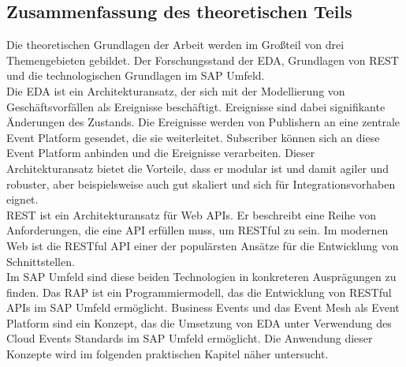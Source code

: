 \subsection{Zusammenfassung des theoretischen Teils}
Die theoretischen Grundlagen der Arbeit werden im Großteil von drei Themengebieten gebildet. Der Forschungsstand der \ac{EDA}, Grundlagen von REST und die technologischen Grundlagen im SAP Umfeld. \\
Die \ac{EDA} ist ein Architekturansatz, der sich mit der Modellierung von Geschäftsvorfällen als Ereignisse beschäftigt. Ereignisse sind dabei signifikante Änderungen des Zustands. Die Ereignisse werden von Publishern an eine zentrale Event Platform gesendet, die sie weiterleitet. Subscriber können sich an diese Event Platform anbinden und die Ereignisse verarbeiten. Dieser Architekturansatz bietet die Vorteile, dass er modular ist und damit agiler und robuster, aber beispielsweise auch gut skaliert und sich für Integrationsvorhaben eignet. \\
REST ist ein Architekturansatz für Web APIs. Er beschreibt eine Reihe von Anforderungen, die eine API erfüllen muss, um RESTful zu sein. Im modernen Web ist die RESTful API einer der populärsten Ansätze für die Entwicklung von Schnittstellen. \\
Im SAP Umfeld sind diese beiden Technologien in konkreteren Ausprägungen zu finden. Das \ac{RAP} ist ein Programmiermodell, das die Entwicklung von RESTful APIs im SAP Umfeld ermöglicht. Business Events und das Event Mesh als Event Platform sind ein Konzept, das die Umsetzung von \ac{EDA} unter Verwendung des Cloud Events Standards im SAP Umfeld ermöglicht. Die Anwendung dieser Konzepte wird im folgenden praktischen Kapitel näher untersucht.